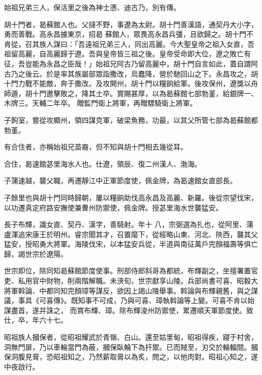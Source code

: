\begin{pinyinscope}
 始祖兄弟三人，保活里之後為神士懣、迪古乃，別有傳。



 胡十門者，曷蘇館人也。父撻不野，事遼為太尉。胡十門善漢語，通契丹大小字，勇而善戰。高永昌據東京，招曷
 蘇館人，眾畏高永昌兵彊，且欲歸之。胡十門不肯從，召其族人謀曰：「吾遠祖兄弟三人，同出高麗。今大聖皇帝之祖入女直，吾祖留高麗，自高麗歸于遼。吾與皇帝皆三祖之後。皇帝受命即大位，遼之敗亡有征，吾豈能為永昌之臣哉！」始祖兄阿古乃留高麗中，胡十門自言如此，蓋自謂阿古乃之後云。於是率其族屬部眾詣撒改，烏蠢降，營於馳回山之下。永昌攻之，胡十門力戰不能敵，奔于撒改。及攻開州，胡十門以糧餉給軍。後攻保州，遼獎以舟師遁，胡十門邀擊敗之，降其士卒。賞賜甚厚，以為曷蘇館七部勃堇，給銀牌一、木牌三。天輔二年卒。
 贈監門衛上將軍，再贈驃騎衛上將軍。



 子鉤室，嘗從攻顯州，領四謀克軍，破梁魚務，功最，以其父所管七部為曷蘇館都勃堇。



 有合住者，亦稱始祖兄苗裔，但不知與胡十門相去幾從耳。



 合住，曷速館苾里海水人也。仕遼，領辰、復二州漢人、渤海。



 子蒲速越，襲父職，再遷靜江中正軍節度使，佩金牌，為曷速館女直部長。



 子餘里也與胡十門同時歸朝，屢以糧餉助伐高永昌及高麗、新羅。後從宗望伐宋，以功遷真定府路安撫使兼曹州防禦使，佩金牌。授苾里海水世襲猛安。



 長子布輝，識女直、契丹、漢字，善騎射。年十
 八，宗弼選為扎也，從阿里、蒲盧渾追宋康王於明州。睿宗聞其才，召置麾下，從經略山東、河北、陜西，襲其父猛安，授昭勇大將軍。海陵伐宋，以本猛安兵從，半道與南征萬戶完顏福壽等俱亡歸，謁世宗於遼陽。



 世宗即位，除同知曷蘇館節度使事。刑部侍郎斜哥為都統，布輝副之，坐擅署置官吏、私用官中財物，削兩階解職。未浹旬，世宗獻享山陵。兵部尚書可喜、昭毅大將軍斡論、中都同知完顏璋等謀反，欲因上謁山陵舉事。斡論與布輝親舊，與之謀議，事具《可喜傳》。既知事不可成，乃與可喜、璋執斡論等上變。可喜不肯以始謀盡首，遂并誅之，
 而賞布輝、璋。除布輝浚州防禦使，累遷順天軍節度使。致仕，卒，年六十七。



 昭祖族人摑保者，從昭祖耀武於青嶺、白山。還至姑里甸，昭祖得疾，寢于村舍，洞無門扉，乃以車輪當門為蔽，摑保臥輪下為扞禦。已而賊至，刃交於輪輻間。摑保洞腹見膏，恐昭祖知之，乃然薪取膏以為炙，問之，以他肉對。昭祖心知之，遂中夜啟行。




\end{pinyinscope}
